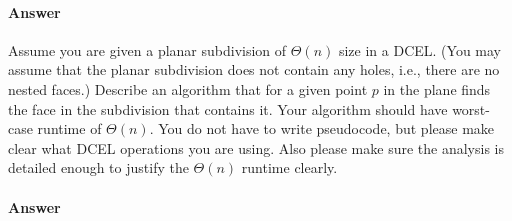 \documentclass{article}
\begin{document}
\paragraph{Answer}


\collab{\todo{}}

Assume you are given a planar subdivision of $\Theta(n)$ size in a DCEL. (You may
assume that the planar subdivision does not contain any holes, i.e., there are
no nested faces.) Describe an algorithm that for a given point $p$ in the plane
finds the face in the subdivision that contains it. Your algorithm should have
worst-case runtime of
$\Theta(n)$. You do not have to write pseudocode, but please make clear what
DCEL operations you are using. Also please make sure the analysis is detailed
enough to justify the $\Theta(n)$ runtime clearly.

\paragraph{Answer}

\end{document}
